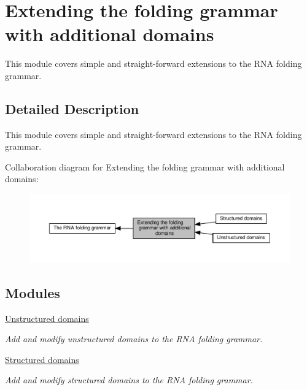 \hypertarget{group__domains}{}\section{Extending the folding grammar with additional domains}
\label{group__domains}


This module covers simple and straight-\/forward extensions to the R\+NA folding grammar.  




\subsection{Detailed Description}
This module covers simple and straight-\/forward extensions to the R\+NA folding grammar. 

Collaboration diagram for Extending the folding grammar with additional domains\+:
\nopagebreak
\begin{figure}[H]
\begin{center}
\leavevmode
\includegraphics[width=350pt]{group__domains}
\end{center}
\end{figure}
\subsection*{Modules}
\begin{DoxyCompactItemize}
\item 
\hyperlink{group__domains__up}{Unstructured domains}
\begin{DoxyCompactList}\small\item\em Add and modify unstructured domains to the R\+NA folding grammar. \end{DoxyCompactList}\item 
\hyperlink{group__domains__struc}{Structured domains}
\begin{DoxyCompactList}\small\item\em Add and modify structured domains to the R\+NA folding grammar. \end{DoxyCompactList}\end{DoxyCompactItemize}
